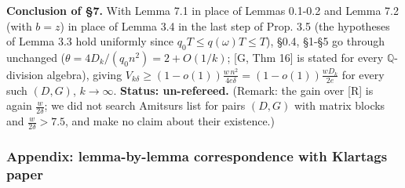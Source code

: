 \textbf{Conclusion of §7.} With Lemma 7.1 in place of Lemmas 0.1-0.2 and Lemma 7.2 (with \(b=z\)) in place of Lemma 3.4 in the last step of Prop. 3.5 (the hypotheses of Lemma 3.3 hold uniformly since \(q_0T\le q(\omega)T\le T\)), §0.4, §1-§5 go through unchanged (\(\theta=4D_k/(q_0n^2)=2+O(1/k)\); {[}G, Thm 16{]} is stated for every \(\mathbb Q\)-division algebra), giving \(V_{k\delta}\ge(1-o(1))\frac{w\,n^2}{4e\delta}=(1-o(1))\frac{wD_k}{2e}\) for every such \((D,G)\), \(k\to\infty\). \textbf{Status: un-refereed.} (Remark: the gain over {[}R{]} is again \(\frac{w}{2\delta}\); we did not search Amitsur\textquotesingle s list for pairs \((D,G)\) with matrix blocks and \(\frac w{2\delta}>7.5\), and make no claim about their existence.)

\hypertarget{appendix-lemma-by-lemma-correspondence-with-klartags-paper}{%
\subsubsection*{Appendix: lemma-by-lemma correspondence with Klartag\textquotesingle s paper}\label{appendix-lemma-by-lemma-correspondence-with-klartags-paper}}

